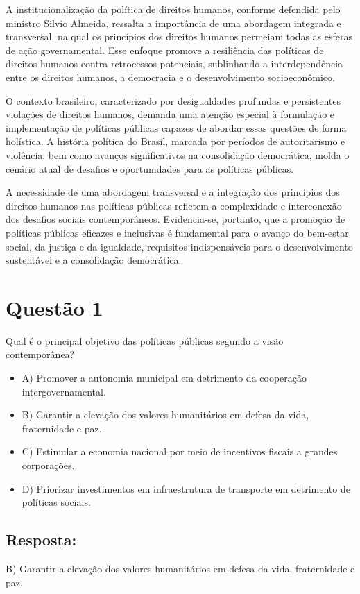 \documentclass[
   article,       
   12pt,          
   oneside,       
   a4paper,       
   english,       
   brazil,        
   sumario=tradicional
   ]{abntex2}
\begin{document}
A institucionalização da política de direitos humanos, conforme defendida pelo ministro Silvio Almeida, ressalta a importância de uma abordagem integrada e transversal, na qual os princípios dos direitos humanos permeiam todas as esferas de ação governamental. Esse enfoque promove a resiliência das políticas de direitos humanos contra retrocessos potenciais, sublinhando a interdependência entre os direitos humanos, a democracia e o desenvolvimento socioeconômico.

O contexto brasileiro, caracterizado por desigualdades profundas e persistentes violações de direitos humanos, demanda uma atenção especial à formulação e implementação de políticas públicas capazes de abordar essas questões de forma holística. A história política do Brasil, marcada por períodos de autoritarismo e violência, bem como avanços significativos na consolidação democrática, molda o cenário atual de desafios e oportunidades para as políticas públicas.

A necessidade de uma abordagem transversal e a integração dos princípios dos direitos humanos nas políticas públicas refletem a complexidade e interconexão dos desafios sociais contemporâneos. Evidencia-se, portanto, que a promoção de políticas públicas eficazes e inclusivas é fundamental para o avanço do bem-estar social, da justiça e da igualdade, requisitos indispensáveis para o desenvolvimento sustentável e a consolidação democrática.
\section{Questão 1}
Qual é o principal objetivo das políticas públicas segundo a visão contemporânea?
\begin{itemize}
    \item A) Promover a autonomia municipal em detrimento da cooperação intergovernamental.
    \item B) Garantir a elevação dos valores humanitários em defesa da vida, fraternidade e paz.
    \item C) Estimular a economia nacional por meio de incentivos fiscais a grandes corporações.
    \item D) Priorizar investimentos em infraestrutura de transporte em detrimento de políticas sociais.
\end{itemize}
\subsection{Resposta:}
B) Garantir a elevação dos valores humanitários em defesa da vida, fraternidade e paz.
\end{document}
